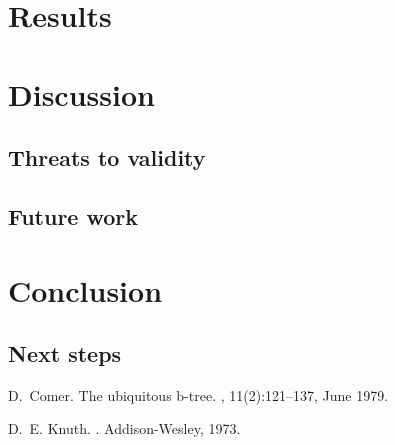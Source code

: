 \documentclass[a4paper]{article}
\begin{document}
\section{Results}


\section{Discussion}

\subsection{Threats to validity}
\subsection{Future work}


\section{Conclusion}

\subsection{Next steps}




%
%

\begin{thebibliography}{Com79}

  D.~Comer.
  \newblock The ubiquitous b-tree.
  , 11(2):121--137, June 1979.

  D.~E. Knuth.
  .
  \newblock Addison-Wesley, 1973.

\end{thebibliography}
\end{document}
